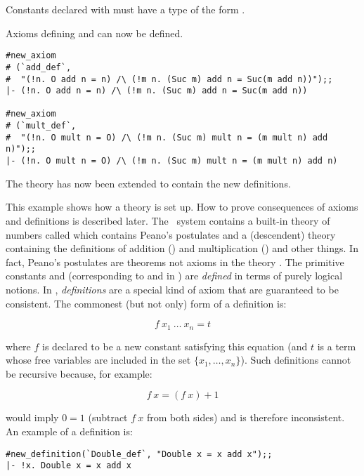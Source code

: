 \noindent Constants declared with 
must have a type of the form
\ml{$\sigma$->($\sigma$->$\sigma$)}.

Axioms defining  and  can now be defined.

\begin{session}\begin{verbatim}
#new_axiom
# (`add_def`,
#  "(!n. O add n = n) /\ (!m n. (Suc m) add n = Suc(m add n))");;
|- (!n. O add n = n) /\ (!m n. (Suc m) add n = Suc(m add n))

#new_axiom
# (`mult_def`,
#  "(!n. O mult n = O) /\ (!m n. (Suc m) mult n = (m mult n) add n)");;
|- (!n. O mult n = O) /\ (!m n. (Suc m) mult n = (m mult n) add n)
\end{verbatim}\end{session}

\noindent The theory  has now been extended to contain the new
definitions.

This example shows how a theory is set up. How to prove consequences of axioms and
definitions is described later. The \HOL\ system contains a built-in
theory of numbers called  which contains Peano's postulates and a
(descendent)  theory  containing the definitions of addition
(\ml{+}) and multiplication (\ml{*}) and other things.
In fact, Peano's
postulates are theorems not axioms in the theory . The primitive constants
 and  (corresponding to  and  in ) are
{\it defined\/} in terms of purely logical notions.
In \HOL, {\it definitions\/} are a special kind of axiom that are
guaranteed to be consistent. The commonest (but not only) form of a definition is:

\[f\ x_1\ \ldots\ x_n = t\]

\noindent where $f$ is declared to be a new constant satisfying this
equation (and $t$ is a term whose free variables are included in the set
$\{x_1,\ldots,x_n\}$).  Such definitions cannot be recursive because, for
example:

\[ f\ x = (f\ x)+1 \]

\noindent would imply $0=1$ (subtract $f\ x$ from both sides)
and is therefore inconsistent. An example of a definition is:

\begin{session}\begin{verbatim}
#new_definition(`Double_def`, "Double x = x add x");;
|- !x. Double x = x add x
\end{verbatim}\end{session}

